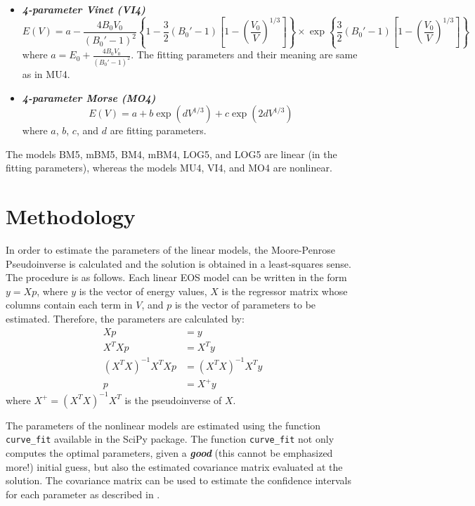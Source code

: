 \documentclass[letter, 12pt]{article}
\begin{document}
\begin{itemize}
	\item \textbf{\textit{4-parameter Vinet (VI4)}}
	\begin{equation*}
		E(V) = a - \frac{4B_0V_0}{(B_0' - 1)^2}\left\{ 1 - \frac{3}{2}(B_0' - 1)\left[ 1 - \left( \frac{V_0}{V} \right)^{1/3} \right] \right\} \times \exp \left\{ \frac{3}{2}(B_0' - 1)\left[ 1 - \left( \frac{V_0}{V} \right)^{1/3} \right] \right\}
	\end{equation*}
	where $a = E_0 + \frac{4B_0V_0}{(B_0' - 1)^2}$. The fitting parameters and their meaning are same as in MU4.
	
	\item \textbf{\textit{4-parameter Morse (MO4)}}
	\begin{equation*}
		E(V) = a + b\exp(dV^{1/3}) + c\exp(2dV^{1/3})
	\end{equation*}
	where $a$, $b$, $c$, and $d$ are fitting parameters.
\end{itemize}

The models BM5, mBM5, BM4, mBM4, LOG5, and LOG5 are linear (in the fitting parameters), whereas the models MU4, VI4, and MO4 are nonlinear.


\section{Methodology}

In order to estimate the parameters of the linear models, the Moore-Penrose Pseudoinverse is calculated and the solution is obtained in a least-squares sense. The procedure is as follows. Each linear EOS model can be written in the form $y = Xp$, where $y$ is the vector of energy values, $X$ is the regressor matrix whose columns contain each term in $V$, and $p$ is the vector of parameters to be estimated. Therefore, the parameters are calculated by:
\begin{align*}
	Xp &= y \\
	X^TXp &= X^Ty \\
	(X^TX)^{-1}X^TXp &= (X^TX)^{-1}X^Ty \\
	p &= X^+y
\end{align*}
where $X^+ = (X^TX)^{-1}X^T$ is the pseudoinverse of $X$.

The parameters of the nonlinear models are estimated using the function \texttt{curve\_fit} available in the SciPy package. The function \texttt{curve\_fit} not only computes the optimal parameters, given a \textbf{\emph{good}} (this cannot be emphasized more!) initial guess, but also the estimated covariance matrix evaluated at the solution. The covariance matrix can be used to estimate the confidence intervals for each parameter as described in \citep{bates1988}.
\end{document}
